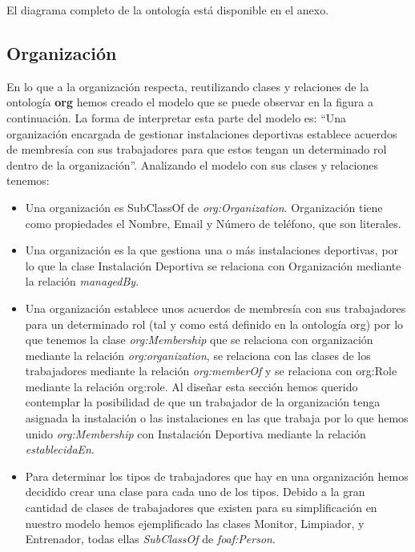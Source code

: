 \documentclass[a4paper,12pt]{article}
\begin{document}
	El diagrama completo de la ontología está disponible en el anexo.
	
	\subsection{Organización}
	
	En lo que a la organización respecta, reutilizando clases y relaciones de la ontología \textbf{org} hemos
creado el modelo que se puede observar en la figura a continuación. La forma de interpretar esta parte del
modelo es: “Una organización encargada de gestionar instalaciones deportivas establece acuerdos
de membresía con sus trabajadores para que estos tengan un determinado rol dentro de la
organización”. Analizando el modelo con sus clases y relaciones tenemos:
	
	\begin{itemize}
		\item Una organización es SubClassOf de \textit{org:Organization}. Organización tiene como
propiedades el Nombre, Email y Número de teléfono, que son literales.
		\item Una organización es la que gestiona una o más instalaciones deportivas, por lo que la
clase Instalación Deportiva se relaciona con Organización mediante la relación
\textit{managedBy}.
		\item Una organización establece unos acuerdos de membresía con sus trabajadores para un
determinado rol (tal y como está definido en la ontología org) por lo que tenemos la clase
\textit{org:Membership} que se relaciona con organización mediante la relación
\textit{org:organization}, se relaciona con las clases de los trabajadores mediante la relación
\textit{org:memberOf} y se relaciona con org:Role mediante la relación org:role. Al diseñar esta
sección hemos querido contemplar la posibilidad de que un trabajador de la organización
tenga asignada la instalación o las instalaciones en las que trabaja por lo que hemos unido
\textit{org:Membership} con Instalación Deportiva mediante la relación \textit{establecidaEn}.
		\item Para determinar los tipos de trabajadores que hay en una organización hemos decidido
crear una clase para cada uno de los tipos. Debido a la gran cantidad de clases de
trabajadores que existen para su simplificación en nuestro modelo hemos ejemplificado
las clases Monitor, Limpiador, y Entrenador, todas ellas \textit{SubClassOf} de \textit{foaf:Person}.
	\end{itemize}
\end{document}
